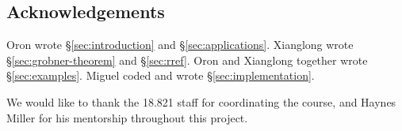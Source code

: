\subsection*{Acknowledgements}

Oron wrote \S\ref{sec:introduction} and \S\ref{sec:applications}. Xianglong wrote \S\ref{sec:grobner-theorem} and \S\ref{sec:rref}. Oron and Xianglong together wrote \S\ref{sec:examples}. Miguel coded and wrote \S\ref{sec:implementation}.

We would like to thank the 18.821 staff for coordinating the course, and Haynes Miller for his mentorship throughout this project.

